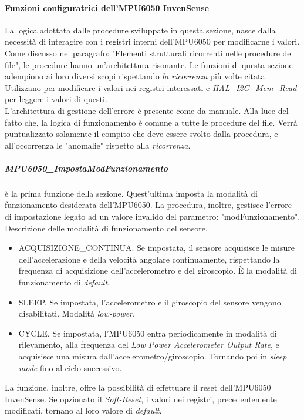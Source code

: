 \paragraph{Funzioni configuratrici dell'MPU6050 InvenSense}
La logica adottata dalle procedure sviluppate in questa sezione, nasce dalla necessità di interagire con i registri interni dell'MPU6050 per modificarne i valori.\\
Come discusso nel paragrafo: "Elementi strutturali ricorrenti nelle procedure del file", le procedure hanno un'architettura risonante. Le funzioni di questa sezione adempiono ai loro diversi scopi rispettando \textit{la ricorrenza} più volte citata.
Utilizzano  per modificare i valori nei registri interessati e \textit{HAL\_I2C\_Mem\_Read} per leggere i valori di questi.\\
L'architettura di gestione dell'errore è presente come da manuale.
Alla luce del fatto che, la logica di funzionamento è comune a tutte le procedure del file. Verrà puntualizzato solamente il compito che deve essere svolto dalla procedura, e all'occorrenza le "anomalie" rispetto alla \textit{ricorrenza}.
\subparagraph{MPU6050\_ImpostaModFunzionamento}
è la prima funzione della sezione. Quest'ultima imposta la modalità di funzionamento desiderata dell'MPU6050. La procedura, inoltre, gestisce l'errore di impostazione legato ad un valore invalido del parametro: "modFunzionamento".\\
Descrizione delle modalità di funzionamento del sensore.
\begin{itemize}
    \item ACQUISIZIONE\_CONTINUA. Se impostata, il sensore acquisisce le misure dell'accelerazione e della velocità angolare continuamente, rispettando la frequenza di acquisizione dell'accelerometro e del giroscopio. È la modalità di funzionamento di \textit{default}.
    \item SLEEP. Se impostata, l'accelerometro e il giroscopio del sensore vengono disabilitati. Modalità \textit{low-power}.
    \item CYCLE. Se impostata, l'MPU6050 entra periodicamente in modalità di rilevamento, alla frequenza del \textit{Low Power Accelerometer Output Rate}, e acquisisce una misura dall'accelerometro/giroscopio. Tornando poi in \textit{sleep mode} fino al ciclo successivo.
\end{itemize}
La funzione, inoltre, offre la possibilità di effettuare il reset dell'MPU6050 InvenSense. Se opzionato il \textit{Soft-Reset}, i valori nei registri, precedentemente modificati, tornano al loro valore di \textit{default}.\\
